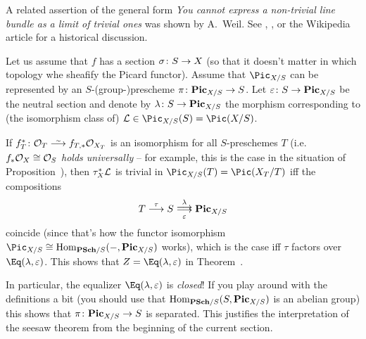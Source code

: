 \documentclass[a4paper,parskip=half,numbers=enddot, DIV=12]{scrreprt}
\begin{document}
\begin{rem}
	\begin{alphanumerate}
		\item A related assertion of the general form \emph{You cannot express a non-trivial line bundle as a limit of trivial ones} was shown by A.\ Weil. See \cite{cornell1986arithmetic}, \cite{mumford1974abelian}, or the Wikipedia article for a historical discussion.
		\item Let us assume that $f$ has a section $\sigma\colon S\morphism X$ (so that it doesn't matter in which topology whe sheafify the Picard functor). Assume that $\Pic_{X/S}$ can be represented by an $S$-(group-)prescheme $\pi\colon\PIC_{X/S}\morphism S$. Let $\epsilon\colon S\morphism\PIC_{X/S}$ be the neutral section and denote by $\lambda\colon S\morphism\PIC_{X/S}$ the morphism corresponding to (the isomorphism class of) $\Ll\in\Pic_{X/S}(S)=\Pic(X/S)$.
		
		If $f_T^*\colon \Oo_T\isomorphism f_{T,*}\Oo_{X_T}$ is an isomorphism for all $S$-preschemes $T$ (i.e.\ $f_*\mathcal{O}_X\cong \mathcal{O}_S$ \emph{holds universally} -- for example, this is the case in the situation of Proposition~), then $\tau_X^*\mathcal{L}$ is trivial in $\Pic_{X/S}(T)=\Pic(X_T/T)$ iff the compositions
		\begin{align*}
			T\morphism[\tau]S\doublemorphism[\lambda][\epsilon]\PIC_{X/S}
		\end{align*}
		coincide (since that's how the functor isomorphism $\Pic_{X/S}\cong \Hom_{\cat{PSch}/S}(-,\PIC_{X/S})$ works), which is the case iff $\tau$ factors over $\Eq(\lambda,\epsilon)$. This shows that $Z=\Eq(\lambda,\epsilon)$ in Theorem~.
		
		In particular, the equalizer $\Eq(\lambda,\epsilon)$ is \emph{closed}! If you play around with the definitions a bit (you should use that $\Hom_{\cat{PSch}/S}(S,\PIC_{X/S})$ is an abelian group) this shows that $\pi\colon \PIC_{X/S}\morphism S$ is separated. This justifies the interpretation of the seesaw theorem from the beginning of the current section.
	\end{alphanumerate}
\end{rem}
\end{document}
